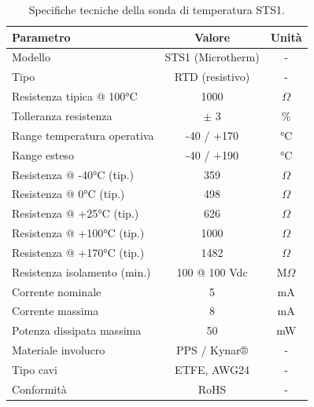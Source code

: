 \begin{table}[htbp]
    \centering
    \caption{Specifiche tecniche della sonda di temperatura STS1.}
    \label{tab:temp_sensor_specs}
    \begin{tabular}{|l|c|c|}
        \hline
        \textbf{Parametro}           & \textbf{Valore}   & \textbf{Unità} \\
        \hline
        Modello                      & STS1 (Microtherm) & -              \\
        Tipo                         & RTD (resistivo)   & -              \\
        Resistenza tipica @ 100°C    & 1000              & $\Omega$       \\
        Tolleranza resistenza        & $\pm$ 3           & \%             \\
        Range temperatura operativa  & -40 / +170        & °C             \\
        Range esteso                 & -40 / +190        & °C             \\
        Resistenza @ -40°C (tip.)    & 359               & $\Omega$       \\
        Resistenza @ 0°C (tip.)      & 498               & $\Omega$       \\
        Resistenza @ +25°C (tip.)    & 626               & $\Omega$       \\
        Resistenza @ +100°C (tip.)   & 1000              & $\Omega$       \\
        Resistenza @ +170°C (tip.)   & 1482              & $\Omega$       \\
        Resistenza isolamento (min.) & 100 @ 100 Vdc     & M$\Omega$      \\
        Corrente nominale            & 5                 & mA             \\
        Corrente massima             & 8                 & mA             \\
        Potenza dissipata massima    & 50                & mW             \\
        Materiale involucro          & PPS / Kynar®      & -              \\
        Tipo cavi                    & ETFE, AWG24       & -              \\
        Conformità                   & RoHS              & -              \\
        \hline
    \end{tabular}
\end{table}

